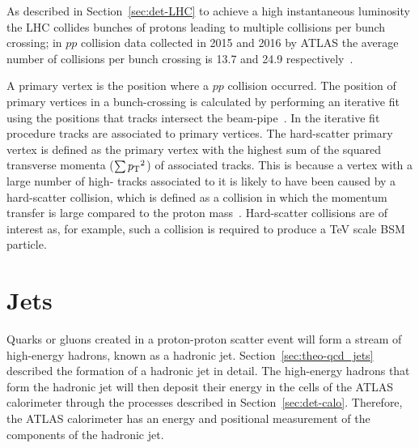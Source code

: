 As described in Section~\ref{sec:det-LHC} to achieve a high instantaneous luminosity the LHC collides bunches of protons leading to multiple collisions per bunch crossing;
in $pp$ collision data collected in 2015 and 2016 by ATLAS the average number of collisions per bunch crossing is 13.7 and 24.9 respectively~\cite{det-ATLAS_lumi_twiki}.

A primary vertex is the position where a $pp$ collision occurred.
The position of primary vertices in a bunch-crossing is calculated by performing
an iterative fit using the positions that tracks intersect the beam-pipe~\cite{obj-tracks_pv}.
In the iterative fit procedure tracks are associated to primary vertices.
The hard-scatter primary vertex is defined as the primary vertex with the highest sum of the squared transverse momenta ($\sum {\ensuremath{p_{\mathrm{T}}}}^2$) of associated tracks.
This is because a vertex with a large number of high-\pT{} tracks associated to it is likely to have been caused by a
hard-scatter collision, which is defined as a collision in which the momentum transfer is large compared to the proton mass~\cite{trig-hard_scatter}.
Hard-scatter collisions are of interest as, for example, such a collision is required to produce a TeV scale BSM particle.

\vspace{-0.5em}
\section{Jets}
\label{sec:obj-jets}

Quarks or gluons created in a proton-proton scatter event
will form a stream of high-energy hadrons, known as a hadronic jet.
Section~\ref{sec:theo-qcd_jets} described the formation of a hadronic jet in detail.
The high-energy hadrons that form the hadronic jet will then deposit their energy in the cells of the ATLAS calorimeter
through the processes described in Section~\ref{sec:det-calo}.
Therefore, the ATLAS calorimeter has an energy and positional measurement of the components of the hadronic jet.


